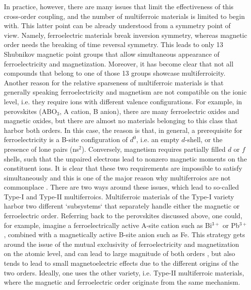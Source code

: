 In practice, however, there are many issues that limit the effectiveness of this cross-order coupling, and the number of multiferroic materials is limited to begin with.
This latter point can be already understood from a symmetry point of view.
Namely, ferroelectric materials break inversion symmetry, whereas magnetic order needs the breaking of time reversal symmetry.
This leads to only 13 Shubnikov magnetic point groups that allow simultaneous appearance of ferroelectricity and magnetization\cite{Wang2009}.
Moreover, it has become clear that not all compounds that belong to one of those 13 groups showcase multiferroicity.
Another reason for the relative sparseness of multiferroic materials is that generally speaking ferroelectricity and magnetism are not compatible on the ionic level, i.e. they require ions with different valence configurations.
For example, in perovskites (ABO$_3$, A cation, B anion), there are many ferroelectric oxides and magnetic oxides, but there are almost no materials belonging to this class that harbor both orders.
In this case, the reason is that, in general, a prerequisite for ferroelectricity is a B-site configuration of $d^0$, i.e. an empty $d$-shell, or the presence of lone pairs (ns$^2$).
Conversely, magnetism requires partially filled $d$ or $f$ shells, such that the unpaired electrons lead to nonzero magnetic moments on the constituent ions.
It is clear that these two requirements are impossible to satisfy simultaneously and this is one of the major reason why multiferroics are not commonplace .
There are two ways around these issues, which lead to so-called Type-I and Type-II multiferroics\cite{Khomskii2009}.
Multiferroic materials of the Type-I variety harbor two different `subsystems` that separately handle either the magnetic or ferroelectric order.
Referring back to the perovskites discussed above, one could, for example, imagine a ferroelectrically active A-site cation such as Bi$^{3+}$ or Pb$^{3+}$, combined with a magnetically active B-site anion such as Fe\cite{Wang2009}.
This strategy gets around the issue of the mutual exclusivity of ferroelectricity and magnetization on the atomic level, and can lead to large magnitude of both orders , but also tends to lead to small magnetoelectric effects due to the different origins of the two orders. 
Ideally, one uses the other variety, i.e. Type-II multiferroic materials, where the magnetic and ferroelectric order originate from the same mechanism.
